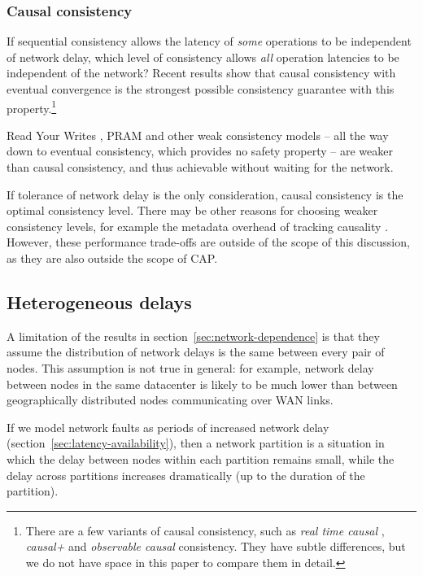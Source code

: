 \documentclass[fleqn,12pt,lineno]{wlpeerj} %
\begin{document}
\subsubsection{Causal consistency}

If sequential consistency allows the latency of \emph{some} operations to be independent of network
delay, which level of consistency allows \emph{all} operation latencies to be independent of the
network? Recent results \citep{Attiya2015dm,Mahajan2011wz} show that causal
consistency with eventual convergence is the strongest possible consistency
guarantee with this property.\footnote{There are a few variants of causal consistency, such as
\emph{real time causal} \citep{Mahajan2011wz}, \emph{causal+} \citep{Lloyd2011hz} and
\emph{observable causal} \citep{Attiya2015dm} consistency. They have subtle differences, but we do
not have space in this paper to compare them in detail.}

Read Your Writes \citep{Terry1994fp}, PRAM \citep{Lipton1988uh} and other weak consistency models --
all the way down to eventual consistency, which provides no safety property \citep{Bailis2013jc} --
are weaker than causal consistency, and thus achievable without waiting for the network.

If tolerance of network delay is the only consideration, causal consistency is the optimal
consistency level. There may be other reasons for choosing weaker consistency levels, for example
the metadata overhead of tracking causality \citep{CharronBost1991ec,Attiya2015dm}. However, these
performance trade-offs are outside of the scope of this discussion, as they are also outside the
scope of CAP.

\subsection{Heterogeneous delays}

A limitation of the results in section~\ref{sec:network-dependence} is that they assume the
distribution of network delays is the same between every pair of nodes. This assumption is not true
in general: for example, network delay between nodes in the same datacenter is likely to be much
lower than between geographically distributed nodes communicating over WAN links.

If we model network faults as periods of increased network delay
(section~\ref{sec:latency-availability}), then a network partition is a situation in which the delay
between nodes within each partition remains small, while the delay across partitions increases
dramatically (up to the duration of the partition).
\end{document}
